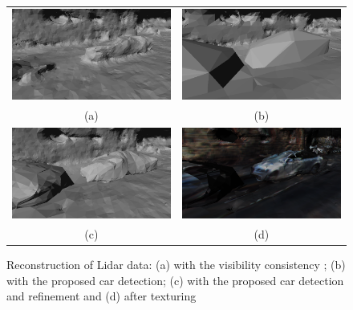 \begin{figure}[tp]
 \centering
    \begin{tabular}{cc}
    \includegraphics[width=0.4\columnwidth]{./img/ch-laser/base00_}&
    \includegraphics[width=0.4\columnwidth]{./img/ch-laser/car00_}\\
    (a)&
    (b)\\
    \includegraphics[width=0.4\columnwidth]{./img/ch-laser/nottext00_}&
    \includegraphics[width=0.4\columnwidth]{./img/ch-laser/text00_}\\
    (c)&
    (d)
 \end{tabular}
 \caption{Reconstruction of Lidar data: (a) with the visibility consistency \cite{romanoni15b}; (b) with the proposed car detection; (c) with the proposed car detection and refinement and (d) after texturing}
 \label{fig:cardetection2}
\end{figure}






